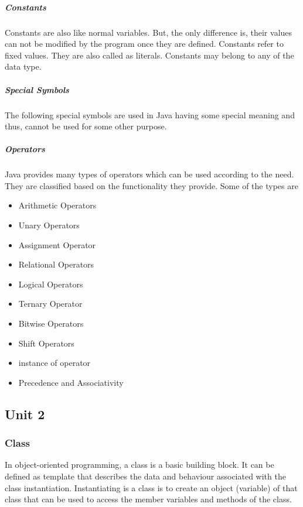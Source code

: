 \documentclass[twocolumn, a4paper]{article}
\begin{document}
\subsubsection{Constants}
Constants are also like normal variables. But, the only difference is,
their values can not be modified by the program once they are defined.
Constants refer to fixed values. They are also called as literals.
Constants may belong to any of the data type.

\subsubsection{Special Symbols}
The following special symbols are used in Java having some special meaning
and thus, cannot be used for some other purpose.

\subsubsection{Operators}
Java provides many types of operators which can be used according to the
need. They are classified based on the functionality they provide. Some of
the types are
\begin{itemize}
  \item Arithmetic Operators
  \item Unary Operators
  \item Assignment Operator
  \item Relational Operators
  \item Logical Operators
  \item Ternary Operator
  \item Bitwise Operators
  \item Shift Operators
  \item instance of operator
  \item Precedence and Associativity
\end{itemize}
\vskip20pt

\begin{tcolorbox}%
  \part{Unit 2}
\end{tcolorbox}
\section{Class}
In object-oriented programming, a class is a basic building block. It can be
defined as template that describes the data and behaviour associated with the
class instantiation. Instantiating is a class is to create an object
(variable) of that class that can be used to access the member variables and
methods of the class.
\end{document}
